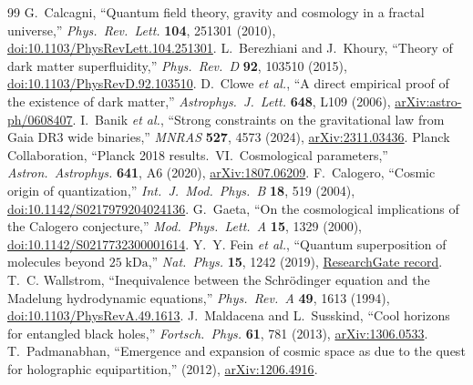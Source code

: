 \documentclass[11pt,letterpaper]{article}
\begin{document}
\begin{thebibliography}{99}\footnotesize
\setlength{\itemsep}{2pt}
 G.~Calcagni, ``Quantum field theory, gravity and cosmology in a fractal universe,'' \emph{Phys.\ Rev.\ Lett.} \textbf{104}, 251301 (2010), \href{https://link.aps.org/doi/10.1103/PhysRevLett.104.251301}{doi:10.1103/PhysRevLett.104.251301}.
 L.~Berezhiani and J.~Khoury, ``Theory of dark matter superfluidity,'' \emph{Phys.\ Rev.\ D} \textbf{92}, 103510 (2015), \href{https://link.aps.org/doi/10.1103/PhysRevD.92.103510}{doi:10.1103/PhysRevD.92.103510}.
 D.~Clowe \emph{et al.}, ``A direct empirical proof of the existence of dark matter,'' \emph{Astrophys.\ J.\ Lett.} \textbf{648}, L109 (2006), \href{https://arxiv.org/abs/astro-ph/0608407}{arXiv:astro-ph/0608407}.
 I.~Banik \emph{et al.}, ``Strong constraints on the gravitational law from Gaia DR3 wide binaries,'' \emph{MNRAS} \textbf{527}, 4573 (2024), \href{https://arxiv.org/abs/2311.03436}{arXiv:2311.03436}.
 Planck Collaboration, ``Planck 2018 results.\ VI.\ Cosmological parameters,'' \emph{Astron.\ Astrophys.} \textbf{641}, A6 (2020), \href{https://arxiv.org/abs/1807.06209}{arXiv:1807.06209}.
 F.~Calogero, ``Cosmic origin of quantization,'' \emph{Int.\ J.\ Mod.\ Phys.\ B} \textbf{18}, 519 (2004), \href{https://www.worldscientific.com/doi/abs/10.1142/S0217979204024136}{doi:10.1142/S0217979204024136}.
 G.~Gaeta, ``On the cosmological implications of the Calogero conjecture,'' \emph{Mod.\ Phys.\ Lett.\ A} \textbf{15}, 1329 (2000), \href{https://www.worldscientific.com/doi/10.1142/S0217732300001614}{doi:10.1142/S0217732300001614}.
 Y.~Y. Fein \emph{et al.}, ``Quantum superposition of molecules beyond $25\;\mathrm{kDa}$,'' \emph{Nat.\ Phys.} \textbf{15}, 1242 (2019), \href{https://www.researchgate.net/publication/335990763_Quantum_superposition_of_molecules_beyond_25_kDa}{ResearchGate record}.
 T.~C. Wallstrom, ``Inequivalence between the Schr\"odinger equation and the Madelung hydrodynamic equations,'' \emph{Phys.\ Rev.\ A} \textbf{49}, 1613 (1994), \href{https://link.aps.org/doi/10.1103/PhysRevA.49.1613}{doi:10.1103/PhysRevA.49.1613}.
 J.~Maldacena and L.~Susskind, ``Cool horizons for entangled black holes,'' \emph{Fortsch.\ Phys.} \textbf{61}, 781 (2013), \href{https://arxiv.org/abs/1306.0533}{arXiv:1306.0533}.
 T.~Padmanabhan, ``Emergence and expansion of cosmic space as due to the quest for holographic equipartition,'' (2012), \href{https://arxiv.org/abs/1206.4916}{arXiv:1206.4916}.

\end{thebibliography}
\end{document}
